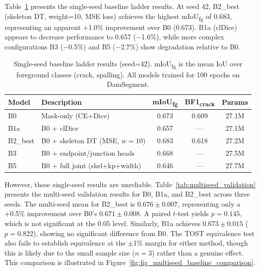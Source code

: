 \documentclass[preprint,12pt]{elsarticle}
\begin{document}
Table~\ref{tab:single_seed_ladder} presents the single-seed baseline ladder results. At seed 42, B2\_best (skeleton DT, weight=10, MSE loss) achieves the highest mIoU\textsubscript{fg} of 0.683, representing an apparent +1.0\% improvement over B0 (0.673). B1a (clDice) appears to decrease performance to 0.657 ($-$1.6\%), while more complex configurations B3 ($-$0.5\%) and B5 ($-$2.7\%) show degradation relative to B0.

\begin{table}[t]
\centering
\caption{Single-seed baseline ladder results (seed=42). mIoU\textsubscript{fg} is the mean IoU over foreground classes (crack, spalling). All models trained for 100 epochs on DamSegment.}
\label{tab:single_seed_ladder}
\begin{tabular}{llccc}
\toprule
Model & Description & mIoU\textsubscript{fg} & BF1\textsubscript{crack} & Params \\
\midrule
B0 & Mask-only (CE+Dice) & 0.673 & 0.609 & 27.1M \\
B1a & B0 + clDice & 0.657 & --- & 27.1M \\
B2\_best & B0 + skeleton DT (MSE, $w{=}10$) & 0.683 & 0.618 & 27.2M \\
B3 & B0 + endpoint/junction heads & 0.668 & --- & 27.5M \\
B5 & B0 + full joint (skel+kp+width) & 0.646 & --- & 27.7M \\
\bottomrule
\end{tabular}
\end{table}

However, these single-seed results are unreliable. Table~\ref{tab:multiseed_validation} presents the multi-seed validation results for B0, B1a, and B2\_best across three seeds. The multi-seed mean for B2\_best is $0.676 \pm 0.007$, representing only a +0.5\% improvement over B0's $0.671 \pm 0.008$. A paired $t$-test yields $p = 0.145$, which is not significant at the 0.05 level. Similarly, B1a achieves $0.673 \pm 0.015$ ($p = 0.822$), showing no significant difference from B0. The TOST equivalence test also fails to establish equivalence at the $\pm$1\% margin for either method, though this is likely due to the small sample size ($n = 3$) rather than a genuine effect. This comparison is illustrated in Figure~\ref{fig:fig_multiseed_baseline_comparison}.
\end{document}

